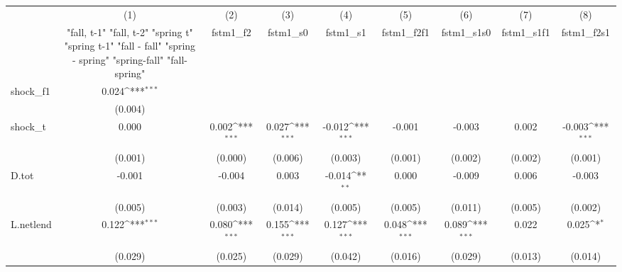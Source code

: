 {
\def\sym#1{\ifmmode^{#1}\else\(^{#1}\)\fi}
\begin{tabular}{l*{8}{c}}
\toprule
            &\multicolumn{1}{c}{(1)}&\multicolumn{1}{c}{(2)}&\multicolumn{1}{c}{(3)}&\multicolumn{1}{c}{(4)}&\multicolumn{1}{c}{(5)}&\multicolumn{1}{c}{(6)}&\multicolumn{1}{c}{(7)}&\multicolumn{1}{c}{(8)}\\
            &\multicolumn{1}{c}{  "fall, t-1" "fall, t-2" "spring t" "spring t-1"  "fall - fall" "spring - spring" "spring-fall" "fall-spring" }&\multicolumn{1}{c}{fstm1\_f2}&\multicolumn{1}{c}{fstm1\_s0}&\multicolumn{1}{c}{fstm1\_s1}&\multicolumn{1}{c}{fstm1\_f2f1}&\multicolumn{1}{c}{fstm1\_s1s0}&\multicolumn{1}{c}{fstm1\_s1f1}&\multicolumn{1}{c}{fstm1\_f2s1}\\
\midrule
shock\_f1    &       0.024\sym{***}&                     &                     &                     &                     &                     &                     &                     \\
            &     (0.004)         &                     &                     &                     &                     &                     &                     &                     \\
\addlinespace
shock\_t     &       0.000         &       0.002\sym{***}&       0.027\sym{***}&      -0.012\sym{***}&      -0.001         &      -0.003         &       0.002         &      -0.003\sym{***}\\
            &     (0.001)         &     (0.000)         &     (0.006)         &     (0.003)         &     (0.001)         &     (0.002)         &     (0.002)         &     (0.001)         \\
\addlinespace
D.tot       &      -0.001         &      -0.004         &       0.003         &      -0.014\sym{**} &       0.000         &      -0.009         &       0.006         &      -0.003         \\
            &     (0.005)         &     (0.003)         &     (0.014)         &     (0.005)         &     (0.005)         &     (0.011)         &     (0.005)         &     (0.002)         \\
\addlinespace
L.netlend   &       0.122\sym{***}&       0.080\sym{***}&       0.155\sym{***}&       0.127\sym{***}&       0.048\sym{***}&       0.089\sym{***}&       0.022         &       0.025\sym{*}  \\
            &     (0.029)         &     (0.025)         &     (0.029)         &     (0.042)         &     (0.016)         &     (0.029)         &     (0.013)         &     (0.014)         \\

\end{tabular}}
